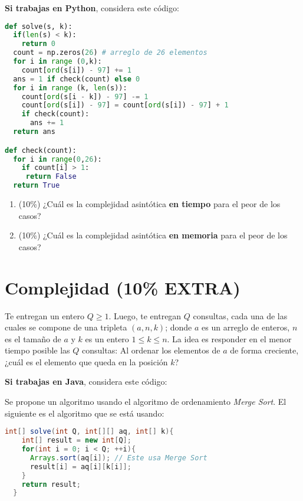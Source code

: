 \documentclass[10 pt]{article}
\begin{document}
\hspace{1cm}

\textbf{Si trabajas en Python}, considera este código:

{\small
\begin{lstlisting}[language = Python]
def solve(s, k):
  if(len(s) < k): 
    return 0
  count = np.zeros(26) # arreglo de 26 elementos
  for i in range (0,k):
    count[ord(s[i]) - 97] += 1
  ans = 1 if check(count) else 0
  for i in range (k, len(s)): 
    count[ord(s[i - k]) - 97] -= 1
    count[ord(s[i]) - 97] = count[ord(s[i]) - 97] + 1
    if check(count):
      ans += 1
  return ans

def check(count):
  for i in range(0,26):
    if count[i] > 1:
     return False
  return True
\end{lstlisting}
}

\begin{enumerate}[label=(\Alph*)]
\item (10\%) ¿Cuál es la complejidad asintótica \textbf{en tiempo} para el peor de los casos?
\item (10\%) ¿Cuál es la complejidad asintótica \textbf{en memoria} para el peor de los casos?

\end{enumerate}

\section{Complejidad (10\% EXTRA)}
Te entregan un entero $Q \geq 1$. Luego, te entregan $Q$ consultas, cada una de las cuales se compone de una tripleta $(a, n, k)$; donde $a$ es un arreglo de enteros, $n$ es el tamaño de $a$ y $k$ es un entero $1 \leq k \leq n$. La idea es responder en el menor tiempo posible las $Q$ consultas: Al ordenar los elementos de $a$ de forma creciente, ¿cuál es el elemento que queda en la posición $k$?

\hspace{1cm}

\textbf{Si trabajas en Java}, considera este código:


 Se propone un algoritmo usando el algoritmo de ordenamiento \emph{Merge Sort}. El siguiente es el algoritmo que se está usando:
   \begin{lstlisting}[language = Java]
  int[] solve(int Q, int[][] aq, int[] k){
    int[] result = new int[Q];
    for(int i = 0; i < Q; ++i){
      Arrays.sort(aq[i]); // Este usa Merge Sort
      result[i] = aq[i][k[i]];
    }
    return result;
  }
  \end{lstlisting}
\end{document}
